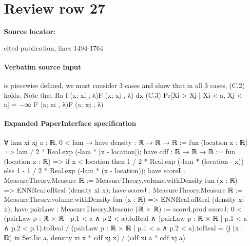 \documentclass[10pt]{article}
\begin{document}
\section*{Review row 27}
\textbf{Source locator:} {\footnotesize\raggedright cited publication, lines 1494-\allowbreak{}1764\par}
\paragraph{Verbatim source input}
\begin{ReviewVerbatim}
is piecewise defined, we must consider 3 cases and show that in all 3 cases, (C.2) holds. Note that
Ra
f (x; xi , λ)F (x; xj , λ) dx
(C.3)
Pr[Xi > Xj | Xi < a, Xj < a] = −∞
F (a; xi , λ)F (a; xj , λ)
\end{ReviewVerbatim}



\paragraph{Expanded PaperInterface specification}
\begin{ReviewVerbatim}
∀ {lam xi xj a : ℝ},
  0 < lam →
    have density : ℝ → ℝ → ℝ := fun (location x : ℝ) => lam / 2 * Real.exp (-lam * |x - location|);
    have cdf : ℝ → ℝ → ℝ := fun (location x : ℝ) =>
      if x < location then 1 / 2 * Real.exp (-lam * (location - x)) else 1 - 1 / 2 * Real.exp (-lam * (x - location));
    have scoreI : MeasureTheory.Measure ℝ :=
      MeasureTheory.volume.withDensity fun (x : ℝ) => ENNReal.ofReal (density xi x);
    have scoreJ : MeasureTheory.Measure ℝ :=
      MeasureTheory.volume.withDensity fun (x : ℝ) => ENNReal.ofReal (density xj x);
    have pairLaw : MeasureTheory.Measure (ℝ × ℝ) := scoreI.prod scoreJ;
    0 < (pairLaw {p : ℝ × ℝ | p.1 < a ∧ p.2 < a}).toReal ∧
      (pairLaw {p : ℝ × ℝ | p.1 < a ∧ p.2 < p.1}).toReal / (pairLaw {p : ℝ × ℝ | p.1 < a ∧ p.2 < a}).toReal =
        (∫ (x : ℝ) in Set.Iic a, density xi x * cdf xj x) / (cdf xi a * cdf xj a)
\end{ReviewVerbatim}
\end{document}
